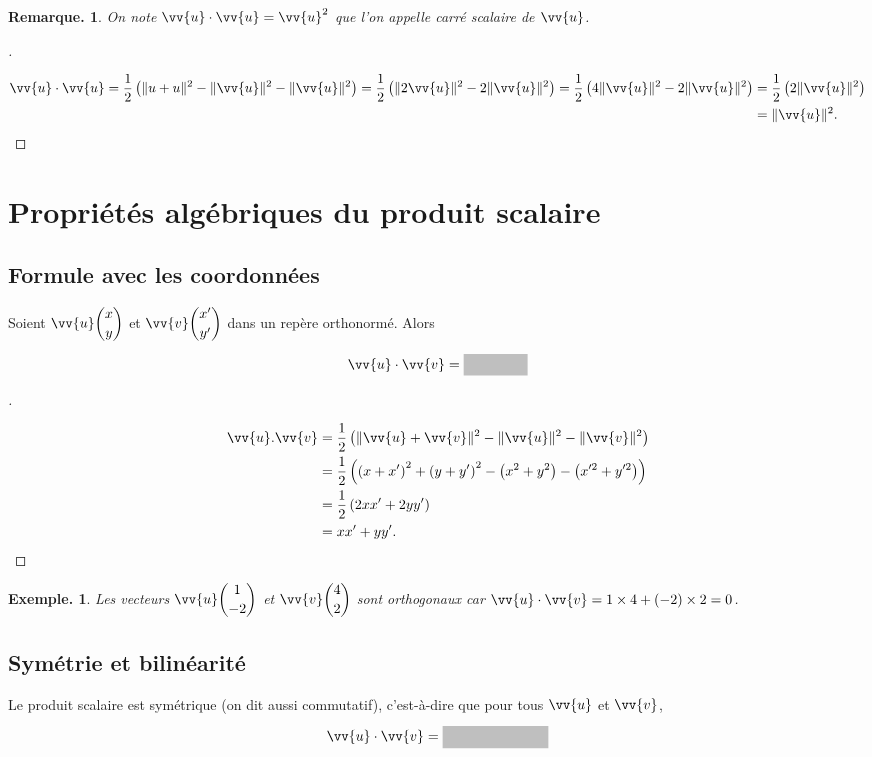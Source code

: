 \documentclass[12pt]{article}
\theoremstyle{break}
\newtheorem*{example}{Exemple.}
\newtheorem*{remark}{Remarque.}
\newenvironment{demo}[1][\proofname]{%
  \begin{proof}[#1]$ $\newline
  }{%
  \end{proof}
}
\begin{document}
\begin{remark}
  On note $\vv{u} \cdot \vv{u}=\vv{u}^{2}$ que l'on appelle carré scalaire de $\vv{u}$.
\end{remark}
\begin{demo}
  \begin{align*}
    \vv{u} \cdot \vv{u}=\dfrac{1}{2}\left(\|u+u\|^{2}-\|\vv{u}\|^{2}-\|\vv{u}\|^{2}\right)=\dfrac{1}{2}\left(\|2 \vv{u}\|^{2}-2\|\vv{u}\|^{2}\right)=\dfrac{1}{2}\left(4\|\vv{u}\|^{2}-2\|\vv{u}\|^{2}\right)&=\dfrac{1}{2}\left(2\|\vv{u}\|^{2}\right)\\
    &=\|\vv{u}\|^{2}.
  \end{align*}
\end{demo}

\section{Propriétés algébriques du produit scalaire}
\subsection{Formule avec les coordonnées}
\begin{proposition}{}{}
  Soient $\vv{u}\dbinom{x}{y}$ et $\vv{v}\dbinom{x^{\prime}}{y^{\prime}}$ dans un repère orthonormé. Alors

  $$
  \vv{u} \cdot \vv{v}=\hideM{x x^{\prime}+y y^{\prime}}
  $$
\end{proposition}

\begin{demo}
  $$
  \begin{aligned}
    \vv{u} . \vv{v} & =\dfrac{1}{2}\left(\|\vv{u}+\vv{v}\|^{2}-\|\vv{u}\|^{2}-\|\vv{v}\|^{2}\right) \\
    & =\dfrac{1}{2}\left(\left(x+x^{\prime}\right)^{2}+\left(y+y^{\prime}\right)^{2}-\left(x^{2}+y^{2}\right)-\left(x^{\prime 2}+y^{\prime 2}\right)\right) \\
    & =\dfrac{1}{2}\left(2 x x^{\prime}+2 y y^{\prime}\right) \\
    & =x x^{\prime}+y y^{\prime} .
  \end{aligned}
  $$
\end{demo}

\begin{example}
  Les vecteurs $\vv{u}\dbinom{1}{-2}$ et $\vv{v}\dbinom{4}{2}$ sont orthogonaux car $\vv{u} \cdot \vv{v}=1 \times 4+(-2) \times 2=0$.
\end{example}

\subsection{Symétrie et bilinéarité}
\begin{proposition}{}{}
  Le produit scalaire est symétrique (on dit aussi commutatif), c'est-à-dire que pour tous $\vv{u}$ et $\vv{v}$,

  $$
  \vv{u} \cdot \vv{v}=\hideM{\vv{v} \cdot \vv{u}}
  $$
\end{proposition}
\end{document}

